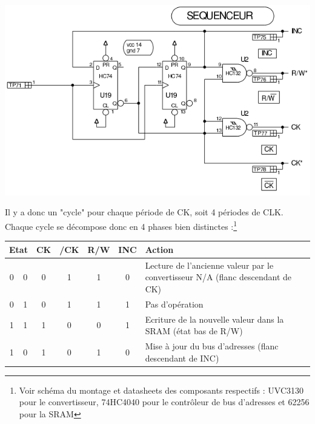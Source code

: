 \documentclass{article}
\begin{document}
\includegraphics[width = 0.7\linewidth]{shema_sequenceur_2.png}


Il y a donc un "cycle" pour chaque période de CK, soit 4 périodes de CLK. Chaque cycle se décompose donc en 4 phases bien distinctes :\footnote{Voir schéma du montage et datasheets des composants respectifs : UVC3130 pour le convertisseur, 74HC4040 pour le contrôleur de bus d'adresses et 62256 pour la SRAM}
\begin{center}
\begin{tabular}{|c|c|c|c|c|c|l|}
\hline
\multicolumn{2}{|c|}{Etat} & CK & /CK & R/W & INC & Action\\
\hline
0 & 0 & 0 & 1 & 1 & 0 & Lecture de l'ancienne valeur par le convertisseur N/A (flanc descendant de CK) \\
0 & 1 & 0 & 1 & 1 & 1 & Pas d'opération\\
1 & 1 & 1 & 0 & 0 & 1 & Ecriture de la nouvelle valeur dans la SRAM (état bas de R/W)\\
1 & 0 & 1 & 0 & 1 & 0 & Mise à jour du bus d'adresses (flanc descendant de INC)\\
\hline
\end{tabular}
\end{center}

\end{document}
